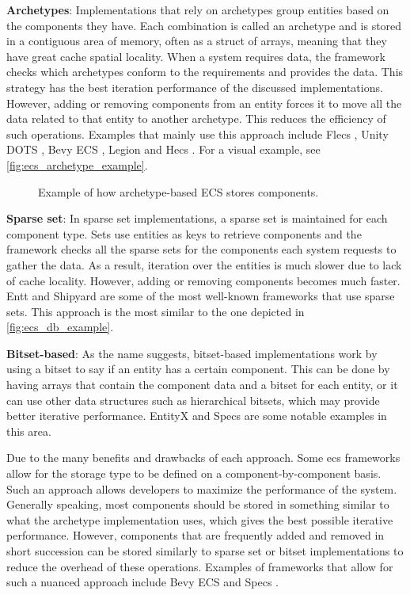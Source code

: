 \documentclass[twoside, 11pt]{article}
\begin{document}
\textbf{Archetypes}: Implementations that rely on archetypes group entities based on the components they have. Each combination is called an archetype and is stored in a contiguous area of memory, often as a struct of arrays, meaning that they have great cache spatial locality. When a system requires data, the framework checks which archetypes conform to the requirements and provides the data. This strategy has the best iteration performance of the discussed implementations. However, adding or removing components from an entity forces it to move all the data related to that entity to another archetype. This reduces the efficiency of such operations. Examples that mainly use this approach include Flecs \cite{flecs}, Unity DOTS \cite{unityDots}, Bevy ECS \cite{bevy}, Legion \cite{legion} and Hecs \cite{hecs}. For a visual example, see \autoref{fig:ecs_archetype_example}.

\begin{figure}
  \centering
  
  \caption[Example of how archetype-based ECS stores components]{Example of how archetype-based ECS stores components.}
  \label{fig:ecs_archetype_example}
\end{figure}

\textbf{Sparse set}: In sparse set implementations, a sparse set is maintained for each component type. Sets use entities as keys to retrieve components and the framework checks all the sparse sets for the components each system requests to gather the data. As a result, iteration over the entities is much slower due to lack of cache locality. However, adding or removing components becomes much faster. Entt \cite{entt} and Shipyard \cite{shipyard} are some of the most well-known frameworks that use sparse sets. This approach is the most similar to the one depicted in \autoref{fig:ecs_db_example}.

\textbf{Bitset-based}: As the name suggests, bitset-based implementations work by using a bitset to say if an entity has a certain component. This can be done by having arrays that contain the component data and a bitset for each entity, or it can use other data structures such as hierarchical bitsets, which may provide better iterative performance. EntityX \cite{entityx} and Specs \cite{specs} are some notable examples in this area.

Due to the many benefits and drawbacks of each approach. Some \gls{ecs} frameworks allow for the storage type to be defined on a component-by-component basis. Such an approach allows developers to maximize the performance of the system. Generally speaking, most components should be stored in something similar to what the archetype implementation uses, which gives the best possible iterative performance. However, components that are frequently added and removed in short succession can be stored similarly to sparse set or bitset implementations to reduce the overhead of these operations. Examples of frameworks that allow for such a nuanced approach include Bevy ECS \cite{bevy} and Specs \cite{specs}.
\end{document}
